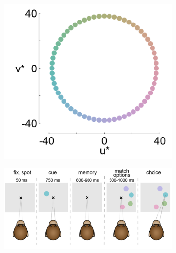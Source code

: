 \begin{figure}
    \centering
    \begin{subfigure}[t]{0.3\textwidth}
         \centering
         \caption{}
         \includegraphics[width=\textwidth]{../Figures/working/F1_ParadigmPredictions/a.png}
         \label{fig:StimuliChromaticities}
    \end{subfigure}
    \hfill
    \begin{subfigure}[t]{0.65\textwidth}
         \centering
         \caption{}
        \includegraphics[width=\textwidth]{../Figures/working/F1_ParadigmPredictions/b.png}
         \label{fig:epochs}
    \end{subfigure}


\end{figure}
